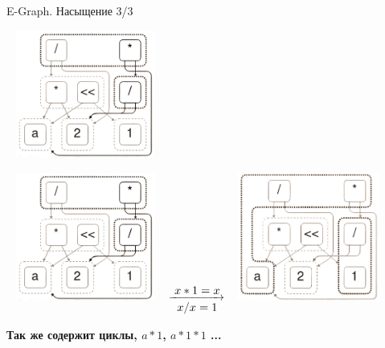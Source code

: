 \documentclass[aspectratio=169
  , xcolor={svgnames}
  , russian  %
  ]{beamer}
\begin{document}
\begin{frame}{E-Graph. Насыщение 3/3}
    {
        \begin{center}
            \includegraphics[width=5.2cm, height=4.2cm]{misc/egraphs_images/egraph_3.jpg} 
        \end{center}
    }
    {
        \begin{center}
            \includegraphics[width=5.2cm, height=4.2cm]{misc/egraphs_images/egraph_3.jpg} 
            \hspace{0.5cm} 
            \raisebox{11.5ex}
            {$\xrightarrow[\text{\fontsize{10.4}{12} $x / x = 1$}]{\text{\fontsize{10.4}{12} $x * 1 = x$}}$}
            \hspace{0.5cm}  
            \includegraphics[width=5.2cm, height=4.2cm]{misc/egraphs_images/egraphs4.jpg} 
            
        \end{center}

        \begin{center}
           \textbf{Так же содержит циклы, $a * 1$, $a * 1 * 1$ ...} \\
        \end{center}
        
    }
\end{frame}
\end{document}
